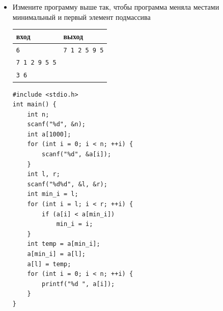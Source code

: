 \documentclass{article}
\begin{document}
\begin{itemize}
\newpage
\item Измените программу выше так, чтобы программа меняла местами минимальный и первый элемент подмассива
\begin{center}
\begin{tabular}{ l | l }
 вход & выход \\ \hline
 \texttt{6} & \texttt{7 1 2 5 9 5}  \\ 
 \texttt{7 1 2 9 5 5} &   \\ 
 \texttt{3 6} &   \\ 
\end{tabular}
\end{center}

\begin{lstlisting}[backgroundcolor = \color{solcolor}]
#include <stdio.h>
int main() {
    int n;
    scanf("%d", &n);
    int a[1000];
    for (int i = 0; i < n; ++i) {
        scanf("%d", &a[i]);
    }
    int l, r;
    scanf("%d%d", &l, &r);
    int min_i = l;
    for (int i = l; i < r; ++i) {
        if (a[i] < a[min_i])
            min_i = i;
    }
    int temp = a[min_i];
    a[min_i] = a[l];
    a[l] = temp;
    for (int i = 0; i < n; ++i) {
        printf("%d ", a[i]);
    } 
}
\end{lstlisting}
\end{itemize}

\newpage
\end{document}

